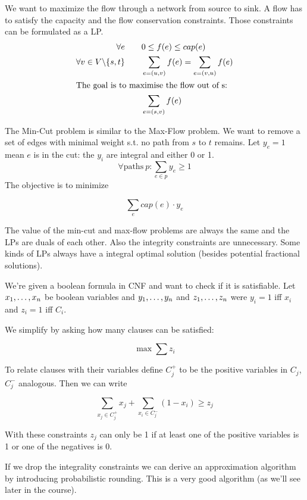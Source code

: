 \begin{itemize}
\begin{Ex}\label{Ex:maxFlowMinCut} We want to maximize the flow through a network from source to sink. A flow has to satisfy the capacity and the flow conservation constraints. Those constraints can be formulated as a LP.
\begin{align*}
\forall e\qquad & 0\leq f(e)\leq cap(e)\\
\forall v\in V\backslash \{s,t\}\qquad & \sum_{e=(u,v)} f(e) = \sum_{e=(v,u)} f(e)\\
\intertext{The goal is to maximise the flow out of s:}
 &\sum_{e=(s,v)} f(e)
\end{align*}
\end{Ex}

\begin{Ex} The Min-Cut problem is similar to the Max-Flow problem. We want to remove a set of edges with minimal weight s.t. no path from $s$ to $t$ remains. Let $y_e=1$ mean $e$ is in the cut: the $y_i$ are integral and either 0 or 1.
\[\forall \mbox{paths}\ p: \sum_{e\in p} y_e \geq 1\]
The objective is to minimize 

\[\sum_e cap(e)\cdot y_e\]

The value of the min-cut and max-flow problems are always the same and the LPs are duals of each other. Also the integrity constraints are unnecessary. Some kinds of LPs always have a integral optimal solution (besides potential fractional solutions).
\end{Ex}

\begin{Ex}[Satisfiability] We're given a boolean formula in CNF and want to check if it is satisfiable. Let ${x}_1,\ldots,{x}_{n}$ be boolean variables and ${y}_1,\ldots,{y}_{n}$ and ${z}_1,\ldots,{z}_{n}$ were $y_i=1$ iff $x_i$ and $z_i=1$ iff $C_i$.

We simplify by asking how many clauses can be satisfied:

\[\max \sum z_i\]

To relate clauses with their variables define $C_j^+$ to be the positive variables in $C_j$, $C_j^-$ analogous. Then we can write 

\[\sum_{x_j\in C_j^+} x_j + \sum_{x_i \in C_j^-} (1-x_i) \geq z_j\]

With these constraints $z_j$ can only be 1 if at least one of the positive variables is 1 or one of the negatives is 0.

If we drop the integrality constraints we can derive an approximation algorithm by introducing probabilistic rounding. This is a very good algorithm (as we'll see later in the course).
\end{Ex}
\end{itemize}